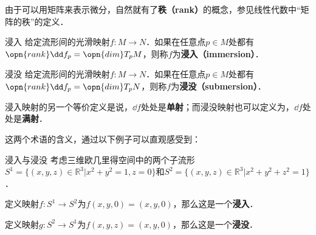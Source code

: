 由于可以用矩阵来表示微分，自然就有了\textbf{秩（rank）}的概念，参见线性代数中“矩阵的秩”的定义．

\begin{definition}{浸入}
给定流形间的光滑映射$f:M\to N$．如果在任意点$p\in M$处都有$\opn{rank}\dd f_p=\opn{dim}T_pM$，则称$f$为\textbf{浸入（immersion）}．
\end{definition}

\begin{definition}{浸没}
给定流形间的光滑映射$f:M\to N$．如果在任意点$p\in M$处都有$\opn{rank}\dd f_p=\opn{dim}T_pN$，则称$f$为\textbf{浸没（submersion）}．
\end{definition}

浸入映射的另一个等价定义是说，$\dd f$处处是\textbf{单射}；而浸没映射也可以定义为，$\dd f$处处是\textbf{满射}．

这两个术语的含义，通过以下例子可以直观感受到：

\begin{example}{浸入与浸没}
考虑三维欧几里得空间中的两个子流形$S^1=\{(x, y, z)\in\mathbb{R}^3|x^2+y^2=1, z=0\}$和$S^2=\{(x, y, z)\in\mathbb{R}^3|x^2+y^2+z^2=1\}$．

定义映射$f:S^1\to S^2$为$f(x, y, 0)=(x, y, 0)$，那么这是一个\textbf{浸入}．

定义映射$g:S^2\to S^1$为$f(x, y, z)=(x, y, 0)$，那么这是一个\textbf{浸没}．
\end{example}

















